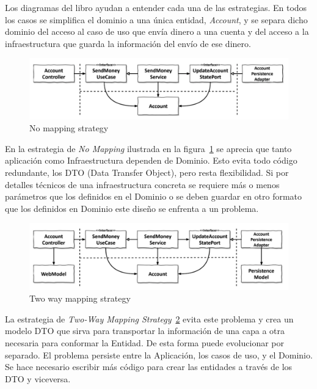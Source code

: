 Los diagramas del libro ayudan a entender cada una de las estrategias.
En todos los casos se simplifica el dominio a una única entidad, \textit{Account}, y se separa dicho dominio del acceso al caso de uso que envía dinero a una cuenta y del acceso a la infraestructura que guarda la información del envío de ese dinero.

\begin{figure}[H]
    \centering
    \includegraphics[height=0.1\textheight]{./part/Ejecucion/Seguimiento/CreateTaskUseCase/img/nomapping}
    \caption{No mapping strategy~\cite{TomHombergs2019GYHD}}\label{fig:nomapping}
\end{figure}

En la estrategia de \textit{No Mapping} ilustrada en la figura~\cref{fig:nomapping} se aprecia que tanto aplicación como Infraestructura dependen de Dominio.
Esto evita todo código redundante, los \gls{DTO} (Data Transfer Object), pero resta flexibilidad.
Si por detalles técnicos de una infraestructura concreta se requiere más o menos parámetros que los definidos en el Dominio o se deben guardar en otro formato que los definidos en Dominio este diseño se enfrenta a un problema.

\begin{figure}[H]
    \centering
    \includegraphics[height=0.1\textheight]{./part/Ejecucion/Seguimiento/CreateTaskUseCase/img/twowaymapping}
    \caption{Two way mapping strategy~\cite{TomHombergs2019GYHD}}\label{fig:twowaymapping}
\end{figure}

La estrategia de \textit{Two-Way Mapping Strategy}~\cref{fig:twowaymapping} evita este problema y crea un modelo DTO que sirva para transportar la información de una capa a otra necesaria para conformar la Entidad.
De esta forma puede evolucionar por separado.
El problema persiste entre la Aplicación, los casos de uso, y el Dominio.
Se hace necesario escribir más código para crear las entidades a través de los DTO y viceversa.

